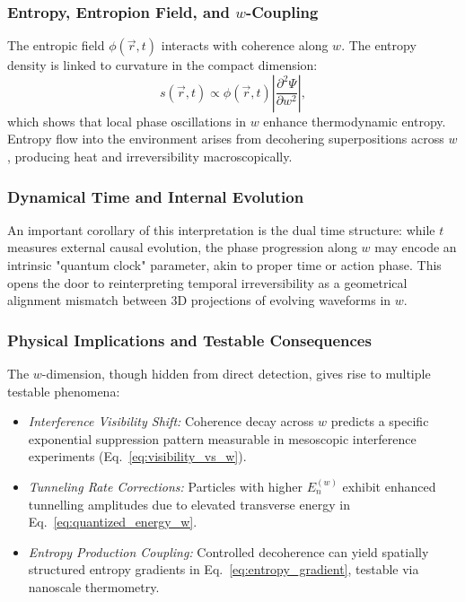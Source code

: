 \documentclass[12pt]{article}
\begin{document}
\subsubsection*{Entropy, Entropion Field, and \(w\)-Coupling}

The entropic field \(\phi(\vec{r}, t)\) interacts with coherence along \(w\). The entropy density is linked to curvature in the compact dimension:
\begin{equation}
s(\vec{r}, t) \propto \phi(\vec{r}, t) \left| \frac{\partial^2 \Psi}{\partial w^2} \right|,
\label{eq:entropy_gradient}
\end{equation}
which shows that local phase oscillations in \(w\) enhance thermodynamic entropy. Entropy flow into the environment arises from decohering superpositions across \(w\), producing heat and irreversibility macroscopically.

\subsubsection*{Dynamical Time and Internal Evolution}

An important corollary of this interpretation is the dual time structure: while \(t\) measures external causal evolution, the phase progression along \(w\) may encode an intrinsic "quantum clock" parameter, akin to proper time or action phase. This opens the door to reinterpreting temporal irreversibility as a geometrical alignment mismatch between 3D projections of evolving waveforms in \(w\).

\subsubsection*{Physical Implications and Testable Consequences}

The \(w\)-dimension, though hidden from direct detection, gives rise to multiple testable phenomena:

\begin{itemize}
  \item \emph{Interference Visibility Shift:} Coherence decay across \(w\) predicts a specific exponential suppression pattern measurable in mesoscopic interference experiments (Eq.~\eqref{eq:visibility_vs_w}).
  \item \emph{Tunneling Rate Corrections:} Particles with higher \(E^{(w)}_n\) exhibit enhanced tunnelling amplitudes due to elevated transverse energy in Eq.~\eqref{eq:quantized_energy_w}.
  \item \emph{Entropy Production Coupling:} Controlled decoherence can yield spatially structured entropy gradients in Eq.~\eqref{eq:entropy_gradient}, testable via nanoscale thermometry.
\end{itemize}
\end{document}
